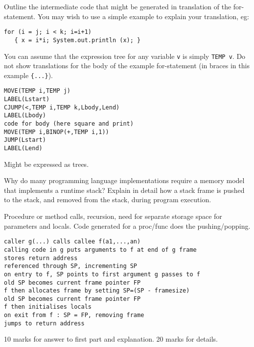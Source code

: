 \documentclass[11pt]{bareexam}
\begin{document}
\begin{questions}
\begin{subquestions}
%
%
%
Outline the intermediate code that might be generated
in translation of the for-statement. You may wish to use a simple
example to explain your translation, eg:
\begin{verbatim}
for (i = j; i < k; i=i+1) 
   { x = i*i; System.out.println (x); }
\end{verbatim}
You can assume that the expression tree for any variable \verb"v" is
simply \verb"TEMP v". Do not show translations for the body of the
example for-statement (in braces in this example \verb+{...}+).

\begin{modelanswer}
\begin{verbatim}
MOVE(TEMP i,TEMP j)
LABEL(Lstart)
CJUMP(<,TEMP i,TEMP k,Lbody,Lend)
LABEL(Lbody)
code for body (here square and print)
MOVE(TEMP i,BINOP(+,TEMP i,1))
JUMP(Lstart)
LABEL(Lend)
\end{verbatim}
Might be expressed as trees.
\end{modelanswer}


\end{subquestions}

\question

\begin{subquestions}
\subquestion
Why do many programming language implementations require a memory model that 
implements a runtime stack?
Explain in detail how a stack frame is pushed to the stack, and 
removed from the stack, during program execution. 

\begin{modelanswer}
Procedure or method calls, recursion, need for separate storage space for
parameters and locals.
Code generated for a proc/func does the pushing/popping.
\begin{verbatim}
caller g(...) calls callee f(a1,...,an)
calling code in g puts arguments to f at end of g frame
stores return address
referenced through SP, incrementing SP
on entry to f, SP points to first argument g passes to f
old SP becomes current frame pointer FP
f then allocates frame by setting SP=(SP - framesize)
old SP becomes current frame pointer FP
f then initialises locals
on exit from f : SP = FP, removing frame
jumps to return address
\end{verbatim}
10 marks for answer to first part and explanation. 20 marks for details.
\end{modelanswer}


\end{subquestions}
\end{questions}
\end{document}
